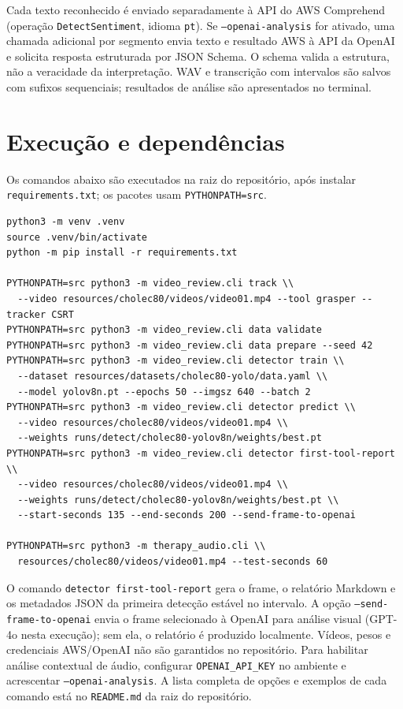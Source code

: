 \documentclass[12pt,a4paper]{article}
\begin{document}
Cada texto reconhecido é enviado separadamente à API do AWS Comprehend (operação \texttt{DetectSentiment}, idioma \texttt{pt}). Se \texttt{--openai-analysis} for ativado, uma chamada adicional por segmento envia texto e resultado AWS à API da OpenAI e solicita resposta estruturada por JSON Schema. O schema valida a estrutura, não a veracidade da interpretação. WAV e transcrição com intervalos são salvos com sufixos sequenciais; resultados de análise são apresentados no terminal.

\section{Execução e dependências}

Os comandos abaixo são executados na raiz do repositório, após instalar \texttt{requirements.txt}; os pacotes usam \texttt{PYTHONPATH=src}.

\begin{lstlisting}[style=terminal]
python3 -m venv .venv
source .venv/bin/activate
python -m pip install -r requirements.txt

PYTHONPATH=src python3 -m video_review.cli track \\
  --video resources/cholec80/videos/video01.mp4 --tool grasper --tracker CSRT
PYTHONPATH=src python3 -m video_review.cli data validate
PYTHONPATH=src python3 -m video_review.cli data prepare --seed 42
PYTHONPATH=src python3 -m video_review.cli detector train \\
  --dataset resources/datasets/cholec80-yolo/data.yaml \\
  --model yolov8n.pt --epochs 50 --imgsz 640 --batch 2
PYTHONPATH=src python3 -m video_review.cli detector predict \\
  --video resources/cholec80/videos/video01.mp4 \\
  --weights runs/detect/cholec80-yolov8n/weights/best.pt
PYTHONPATH=src python3 -m video_review.cli detector first-tool-report \\
  --video resources/cholec80/videos/video01.mp4 \\
  --weights runs/detect/cholec80-yolov8n/weights/best.pt \\
  --start-seconds 135 --end-seconds 200 --send-frame-to-openai

PYTHONPATH=src python3 -m therapy_audio.cli \\
  resources/cholec80/videos/video01.mp4 --test-seconds 60
\end{lstlisting}

O comando \texttt{detector first-tool-report} gera o frame, o relatório Markdown e os metadados JSON da primeira detecção estável no intervalo. A opção \texttt{--send-frame-to-openai} envia o frame selecionado à OpenAI para análise visual (GPT-4o nesta execução); sem ela, o relatório é produzido localmente. Vídeos, pesos e credenciais AWS/OpenAI não são garantidos no repositório. Para habilitar análise contextual de áudio, configurar \texttt{OPENAI\_API\_KEY} no ambiente e acrescentar \texttt{--openai-analysis}. A lista completa de opções e exemplos de cada comando está no \texttt{README.md} da raiz do repositório.
\end{document}
